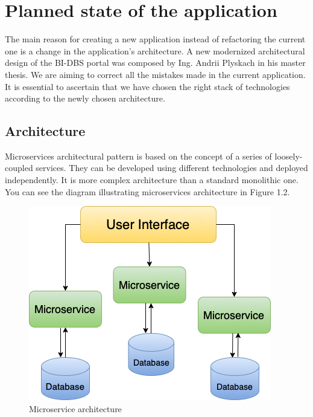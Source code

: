 \section{Planned state of the application} The main reason for creating a new application instead of refactoring the current one is a change in the application's architecture. A new modernized architectural design of the BI-DBS portal was composed by Ing. Andrii Plyskach in his master thesis\cite{mt-plyskach}. We are aiming to correct all the mistakes made in the current application. It is essential to ascertain that we have chosen the right stack of technologies according to the newly chosen architecture.

\subsection{Architecture}
Microservices architectural pattern\cite{architecture-haris} is based on the concept of a series of loosely-coupled services. They can be developed using different technologies and deployed independently. It is more complex architecture than a standard monolithic one. You can see the diagram illustrating microservices architecture in Figure 1.2. 

\begin{figure}[hp]
\centering
\includegraphics[scale=0.67]{../png/microservices.png}
\caption{Microservice architecture}\label{picture:microservices}
\end{figure}


